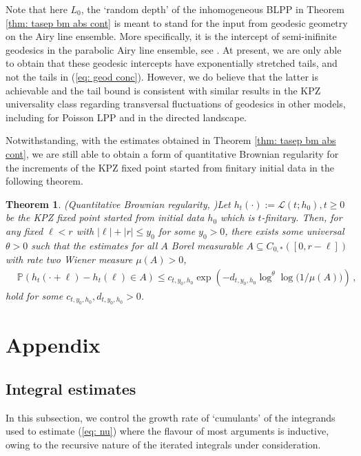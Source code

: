 \documentclass[11pt, reqno]{amsart}
\numberwithin{equation}{section}
\newcounter{dummy} \numberwithin{dummy}{section}
\newtheorem{theorem}[dummy]{Theorem}
\newcommand{\PP}{\ensuremath{\mathbb{P}}}
\begin{document}
Note that here $L_0$, the `random depth' of the inhomogeneous BLPP in Theorem \ref{thm: tasep bm abs cont} is meant to stand for the input from geodesic geometry on the Airy line ensemble. More specifically, it is the intercept of semi-inifinite geodesics in the parabolic Airy line ensemble, see \cite[Definition 4.2 and Lemma 4.2]{tassopoulos2025quantitativebrownianregularitykpz}. At present, we are only able to obtain that these geodesic intercepts have exponentially stretched tails, and not the tails in (\ref{eq: geod conc}). However, we do believe that the latter is achievable and the tail bound is consistent with similar results in the KPZ universality class regarding transversal fluctuations of geodesics in other models, including \cite[Proposition 6.2]{basu2018coalescencegeodesicsexactlysolvable} for Poisson LPP and \cite[Lemma 3.13]{RahmanGeodInterface} in the directed landscape.

Notwithstanding, with the estimates obtained in Theorem \ref{thm: tasep bm abs cont}, we are still able to obtain a form of quantitative Brownian regularity for the increments of the KPZ fixed point started from finitary initial data in the following theorem. 

\begin{theorem}(Quantitative Brownian regularity, \cite[Theorem 6.6]{tassopoulos2025quantitativebrownianregularitykpz})\label{thm: KPZ reg finitary}
     Let $h_t(\cdot):=\mathcal{L}(t;h_0), t\ge 0$ be the KPZ fixed point started from initial data $h_0$ which is $t$-finitary. Then, for any fixed $\ell<r$ with $|\ell|+ |r|\le y_0$ for some $y_0>0$, there exists some universal $\theta> 0$ such that the estimates for all $A$ Borel measurable $A\subseteq C_{0,*}([0,r-\ell])$ with rate two Wiener measure $\mu(A) > 0$,
\begin{equation*}
\begin{array}{cc}
     &\PP(h_t(\cdot + \ell)-h_t(\ell)\in A)\le c_{t, y_0, h_0}\exp\left( -d_{t, y_0, h_0}\log^{\theta}\log\big(1/\mu(A)\big)\right)\,,
\end{array}
\end{equation*} 
hold for some $c_{t, y_0, h_0}, d_{t, y_0, h_0}>0$.
\end{theorem}

\section{Appendix}\label{sec: Appendix}

\subsection{Integral estimates}\label{app: int est}
In this subsection, we control the growth rate of `cumulants' of the integrands used to estimate (\ref{eq: nu}) where the flavour of most arguments is inductive, owing to the recursive nature of the iterated integrals under consideration.
\end{document}
